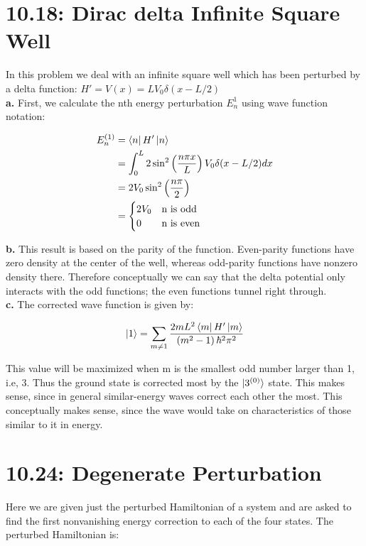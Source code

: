 \documentclass[10pt]{article} %
\begin{document}
\section{10.18: Dirac delta Infinite Square Well}
In this problem we deal with an infinite square well which has been perturbed by a delta function:
$H' = V(x) = LV_0\delta(x-L/2)$\\

\textbf{a.} First, we calculate the nth energy perturbation $E_n^1$ using wave function notation:

\begin{align*}
  E_n^{(1)} &= \bra{n}H'\ket{n}\\
  &= \int_0^L 2\sin^2\left(\frac{n\pi x}{L}\right)V_0\delta(x-L/2)dx\\
  &= 2V_0\sin^2\left(\frac{n\pi}{2}\right)\\
  &= \begin{cases}
    2V_0 & \mbox{n is odd}\\
    0 & \mbox{n is even}\\
  \end{cases}\\
\end{align*}

\textbf{b.}
This result is based on the parity of the function. Even-parity functions have zero density at the
center of the well, whereas odd-parity functions have nonzero density there. Therefore conceptually
we can say that the delta potential only interacts with the odd functions; the even functions tunnel
right through.\\

\textbf{c.}
The corrected wave function is given by:

\begin{align*}
  \ket{1} = \sum_{m\neq1} \frac{2mL^2\bra{m}H'\ket{m}}{\left(m^2-1\right)\hbar^2\pi^2}\\
\end{align*}

This value will be maximized when m is the smallest odd number larger than 1, i.e, 3. Thus the
ground state is corrected most by the $\ket{3^{(0)}}$ state. This makes sense, since in general
similar-energy waves correct each other the most. This conceptually makes sense, since the wave
would take on characteristics of those similar to it in energy.\\

\section{10.24: Degenerate Perturbation}
Here we are given just the perturbed Hamiltonian of a system and are asked to find the first
nonvanishing energy correction to each of the four states. The perturbed Hamiltonian is:
\end{document}
